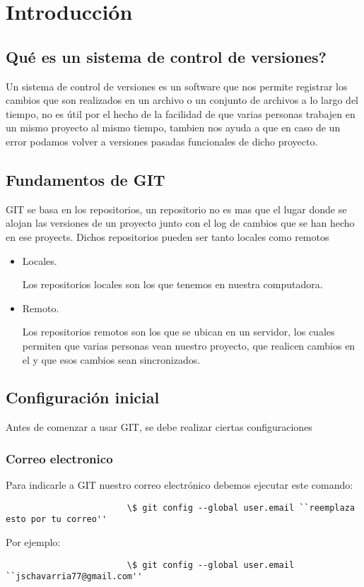 \section{Introducci\'on}
    \subsection{Qu\'e es un sistema de control de versiones?}
        Un sistema de control de versiones es un software que nos permite registrar los cambios que son realizados en un archivo o un conjunto de archivos a lo largo del tiempo, no es \'util por el hecho de la facilidad de que varias personas trabajen en un mismo proyecto al mismo tiempo, tambien nos ayuda a que en caso de un error podamos volver a versiones pasadas funcionales de dicho proyecto.

    \subsection{Fundamentos de GIT}
        GIT se basa en los repositorios, un repositorio no es mas que el lugar donde se alojan las versiones de un proyecto junto con el log de cambios que se han hecho en ese proyects.
        Dichos repositorios pueden ser tanto locales como remotos
            \begin{itemize}
                \item Locales.

                    Los repositorios locales son los que tenemos en nuestra computadora.

                \item Remoto.

                    Los repositorios remotos son los que se ubican en un servidor, los cuales permiten que varias personas vean nuestro proyecto, que realicen cambios en el y que esos cambios sean sincronizados.
            \end{itemize}

    \subsection{Configuraci\'on inicial}
            Antes de comenzar a usar GIT, se debe realizar ciertas configuraciones
            \subsubsection{Correo electronico}
                Para indicarle a GIT nuestro correo electr\'onico debemos ejecutar este comando:
                    \begin{lstlisting}
                        \$ git config --global user.email ``reemplaza esto por tu correo''
                    \end{lstlisting}
                    Por ejemplo:
                    \begin{lstlisting}
                        \$ git config --global user.email ``jschavarria77@gmail.com''
                    \end{lstlisting}
